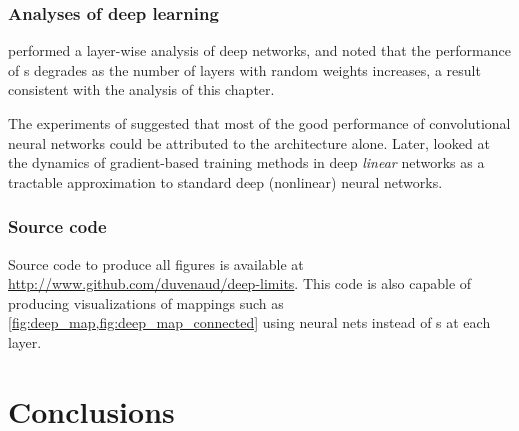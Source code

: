 \subsubsection{Analyses of deep learning}
\citet{montavon2010layer} performed a layer-wise analysis of deep networks, and noted that the performance of \MLP{}s degrades as the number of layers with random weights increases, a result consistent with the analysis of this chapter.

The experiments of \citet{saxe2011random} suggested that most of the good performance of convolutional neural networks could be attributed to the architecture alone.
Later, \citet{saxedynamics} looked at the dynamics of gradient-based training methods in deep \emph{linear} networks as a tractable approximation to standard deep (nonlinear) neural networks.  








\subsubsection{Source code}
Source code to produce all figures is available at \url{http://www.github.com/duvenaud/deep-limits}.
This code is also capable of producing visualizations of mappings such as \cref{fig:deep_map,fig:deep_map_connected} using neural nets instead of \gp{}s at each layer.


\section{Conclusions}


